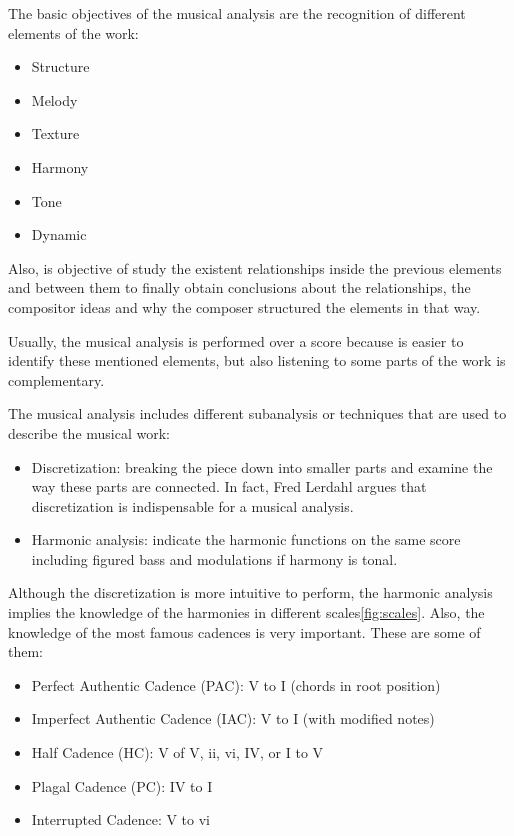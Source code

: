 \documentclass[a4paper,openany,oneside,12pt]{book}
\begin{document}
The basic objectives of the musical analysis are the recognition of different elements of the work:

\begin{itemize}
\item Structure
\item Melody
\item Texture
\item Harmony
\item Tone
\item Dynamic
\end{itemize}

Also, is objective of study the existent relationships inside the previous elements and between them to finally obtain conclusions about the relationships, the compositor ideas and why the composer structured the elements in that way.

Usually, the musical analysis is performed over a score because is easier to identify these mentioned elements, but also listening to some parts of the work is complementary.

The musical analysis includes different subanalysis or techniques that are used to describe the musical work:

\begin{itemize}
\item Discretization: breaking the piece down into smaller parts and examine the way these parts are connected. In fact, Fred Lerdahl\cite{Lerdahl} argues that discretization is indispensable for a musical analysis.
\item Harmonic analysis: indicate the harmonic functions on the same score including figured bass and modulations if harmony is tonal.
\end{itemize}

Although the discretization is more intuitive to perform, the harmonic analysis implies the knowledge of the harmonies in different scales\ref{fig:scales}. Also, the knowledge of the most famous cadences is very important. These are some of them:

\begin{itemize}
\item Perfect Authentic Cadence (PAC): V to I (chords in root position)
\item Imperfect Authentic Cadence (IAC): V to I (with modified notes)
\item Half Cadence (HC): V of V, ii, vi, IV, or I to V
\item Plagal Cadence (PC): IV to I
\item Interrupted Cadence: V to vi
\end{itemize}
\end{document}
